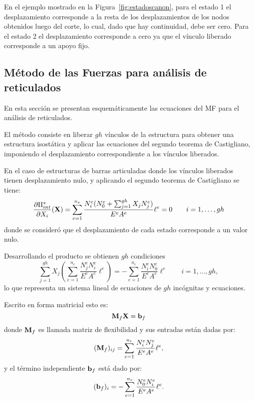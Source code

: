 En el ejemplo mostrado en la Figura~\ref{fig:estadoscanon}, para el estado 1 el desplazamiento corresponde a la resta de los desplazamientos de los nodos obtenidos luego del corte, lo cual, dado que hay continuidad, debe ser cero. %
%
Para el estado 2 el desplazamiento corresponde a cero ya que el vínculo liberado corresponde a un apoyo fijo. %
%


\subsection{Método de las Fuerzas para análisis de reticulados}

En esta sección se presentan esquemáticamente las ecuaciones del MF para el análisis de reticulados.


El método consiste en liberar $gh$ vínculos de la estructura para obtener una estructura isostática y aplicar las ecuaciones del segundo teorema de Castigliano, imponiendo el desplazamiento correspondiente a los vínculos liberados. %

En el caso de estructuras de barras articuladas donde los vínculos liberados tienen desplazamiento nulo, y aplicando el segundo teorema de Castigliano se tiene:
%
\begin{equation}
 \frac{\partial \Pi_{int}^*}{ \partial X_i}({\bf X}) =  \sum_{e=1}^{n_e} \frac{N_i^e(N_0^e + \sum_{j=1}^{gh} X_j N_j^e)}{E^e A^e} \ell^e = 0
 \qquad i=1,\dots, gh
\end{equation}
%
donde se consideró que el desplazamiento de cada estado corresponde a un valor nulo. %

Desarrollando el producto se obtienen $gh$ condiciones
\begin{equation}
\sum_{j=1}^{gh}  X_j \left( \sum_{e=1}^{n_e}  \frac{ N_j^e N_i^e } {E^e A^e} \ell^e \right) = - \sum_{e=1}^{n_e} \frac{N_i^e N_0^e } {E^e A^e} \ell^e \qquad i=1,\dots,gh,
\end{equation}
%
lo que representa un sistema lineal de ecuaciones de $gh$ incógnitas y ecuaciones.


Escrito en forma matricial esto es:
\begin{equation}\label{eqn:ecflex}
{\bf M}_f {\bf X} = {\bf b}_f
\end{equation}
%
donde ${\bf M}_f$ es llamada matriz de flexibilidad y sus entradas están dadas por:
%
\begin{equation}
({\bf M}_f)_{ij} =  \sum_{e=1}^{n_e} \frac{N_i^e N_j^e }{E^e A^e} \ell^e,
\end{equation}
y el término independiente ${\bf b}_f$ está dado por:
%
\begin{equation}
({\bf b}_f)_{i} =  - \sum_{e=1}^{n_e} \frac{N_0^e N_i^e }{E^e A^e} \ell^e.
\end{equation}


